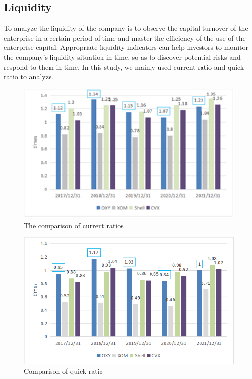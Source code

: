 \documentclass[
	a4paper, %
	12pt,%
]{CSSullivanBusinessReport}
\begin{document}
\begin{fullwidth}
\subsection{Liquidity}
To analyze the liquidity of the company is to observe the capital turnover of the enterprise in a certain period of time and master the efficiency of the use of the enterprise capital. Appropriate liquidity indicators can help investors to monitor the company's liquidity situation in time, so as to discover potential risks and respond to them in time.
 In this study, we mainly used current ratio and quick ratio to analyze.
 \begin{figure}[h]
     \centering
     \includegraphics[width=15cm]{Images/comparison of current ratios.png}
     \caption{The comparison of current ratios}
     \label{The comparsion of current ratios}
 \end{figure}

\begin{figure}[h]
    \centering
    \includegraphics[width=15cm]{Images/Comparison of quick ratio.png}
    \caption{Comparison of quick ratio}
    \label{comparison of quick ratio}
\end{figure}
 

\end{fullwidth}
\end{document}
